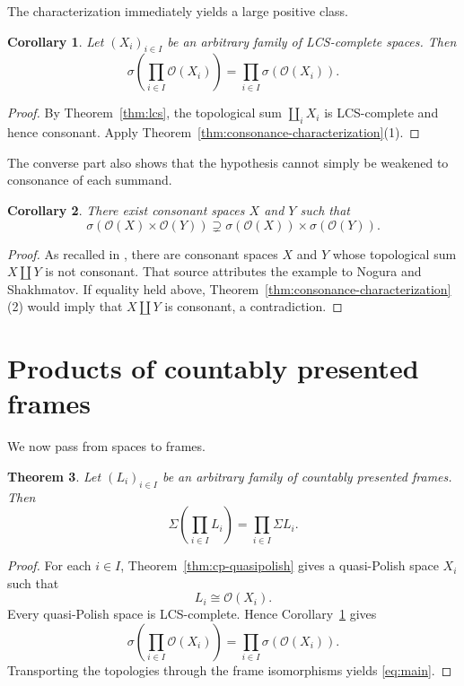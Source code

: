 \documentclass[11pt,reqno]{amsart}
\newtheorem{theorem}{Theorem}[section]
\newtheorem{corollary}[theorem]{Corollary}
\theoremstyle{definition}
\numberwithin{equation}{section}
\newcommand{\OO}{\mathcal O}
\begin{document}
The characterization immediately yields a large positive class.

\begin{corollary}\label{cor:lcs-products}
Let $(X_i)_{i\in I}$ be an arbitrary family of LCS-complete spaces.  Then
\[
  \sigma\!\left(\prod_{i\in I}\OO(X_i)\right)
  =\prod_{i\in I}\sigma(\OO(X_i)).
\]
\end{corollary}

\begin{proof}
By Theorem~\ref{thm:lcs}, the topological sum $\coprod_iX_i$ is
LCS-complete and hence consonant.  Apply
Theorem~\ref{thm:consonance-characterization}(1).
\end{proof}

The converse part also shows that the hypothesis cannot simply be weakened to
consonance of each summand.

\begin{corollary}\label{cor:strict-consonant}
There exist consonant spaces $X$ and $Y$ such that
\[
  \sigma(\OO(X)\times\OO(Y))
  \supsetneq
  \sigma(\OO(X))\times\sigma(\OO(Y)).
\]
\end{corollary}

\begin{proof}
As recalled in \citep[Section~13]{deBrechtEtAl2019}, there are consonant
spaces $X$ and $Y$ whose topological sum $X\coprod Y$ is not consonant.
That source attributes the example to Nogura and Shakhmatov.  If equality held above, Theorem~\ref{thm:consonance-characterization}(2)
would imply that $X\coprod Y$ is consonant, a contradiction.
\end{proof}

\section{Products of countably presented frames}\label{sec:products}

We now pass from spaces to frames.

\begin{theorem}\label{thm:main}
Let $(L_i)_{i\in I}$ be an arbitrary family of countably presented frames.
Then
\begin{equation}\label{eq:main}
  \Sigma\!\left(\prod_{i\in I}L_i\right)
  =\prod_{i\in I}\Sigma L_i.
\end{equation}
\end{theorem}

\begin{proof}
For each $i\in I$, Theorem~\ref{thm:cp-quasipolish} gives a quasi-Polish
space $X_i$ such that
\[
  L_i\cong\OO(X_i).
\]
Every quasi-Polish space is LCS-complete.  Hence
Corollary~\ref{cor:lcs-products} gives
\[
  \sigma\!\left(\prod_{i\in I}\OO(X_i)\right)
  =\prod_{i\in I}\sigma(\OO(X_i)).
\]
Transporting the topologies through the frame isomorphisms yields
\eqref{eq:main}.
\end{proof}
\end{document}
